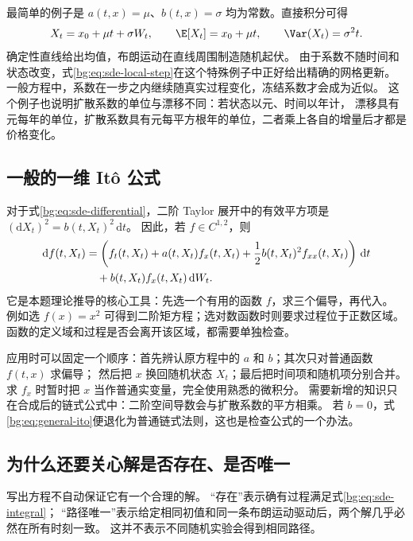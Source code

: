最简单的例子是 $a(t,x)=\mu$、$b(t,x)=\sigma$ 均为常数。直接积分可得
\begin{equation}
 X_t=x_0+\mu t+\sigma W_t,\qquad
 \E[X_t]=x_0+\mu t,\qquad \Var(X_t)=\sigma^2t.
 \label{bg:eq:additive-sde}
\end{equation}
确定性直线给出均值，布朗运动在直线周围制造随机起伏。
由于系数不随时间和状态改变，式\eqref{bg:eq:sde-local-step}在这个特殊例子中正好给出精确的网格更新。
一般方程中，系数在一步之内继续随真实过程变化，冻结系数才会成为近似。
这个例子也说明扩散系数的单位与漂移不同：若状态以元、时间以年计，
漂移具有元每年的单位，扩散系数具有元每平方根年的单位，二者乘上各自的增量后才都是价格变化。

\subsection{一般的一维 It\^o 公式}
\label{bg:sub:general-ito}

对于式\eqref{bg:eq:sde-differential}，二阶 Taylor 展开中的有效平方项是
$(\mathrm dX_t)^2=b(t,X_t)^2\,\mathrm dt$。
因此，若 $f\in C^{1,2}$，则
\begin{align}
  \mathrm df(t,X_t)
  &=\left(f_t(t,X_t)+a(t,X_t)f_x(t,X_t)
          +\frac12 b(t,X_t)^2f_{xx}(t,X_t)\right)\,\mathrm dt
  \notag\\
  &\quad+b(t,X_t)f_x(t,X_t)\,\mathrm dW_t.
  \label{bg:eq:general-ito}
\end{align}
它是本题理论推导的核心工具：先选一个有用的函数 $f$，求三个偏导，再代入。
例如选 $f(x)=x^2$ 可得到二阶矩方程；选对数函数时则要求过程位于正数区域。
函数的定义域和过程是否会离开该区域，都需要单独检查。

应用时可以固定一个顺序：首先辨认原方程中的 $a$ 和 $b$；其次只对普通函数 $f(t,x)$ 求偏导；
然后把 $x$ 换回随机状态 $X_t$；最后把时间项和随机项分别合并。
求 $f_x$ 时暂时把 $x$ 当作普通实变量，完全使用熟悉的微积分。
需要新增的知识只在合成后的链式公式中：二阶空间导数会与扩散系数的平方相乘。
若 $b=0$，式\eqref{bg:eq:general-ito}便退化为普通链式法则，这也是检查公式的一个办法。

\subsection{为什么还要关心解是否存在、是否唯一}
\label{bg:sub:existence}

写出方程不自动保证它有一个合理的解。
“存在”表示确有过程满足式\eqref{bg:eq:sde-integral}；
“路径唯一”表示给定相同初值和同一条布朗运动驱动后，两个解几乎必然在所有时刻一致。
这并不表示不同随机实验会得到相同路径。

